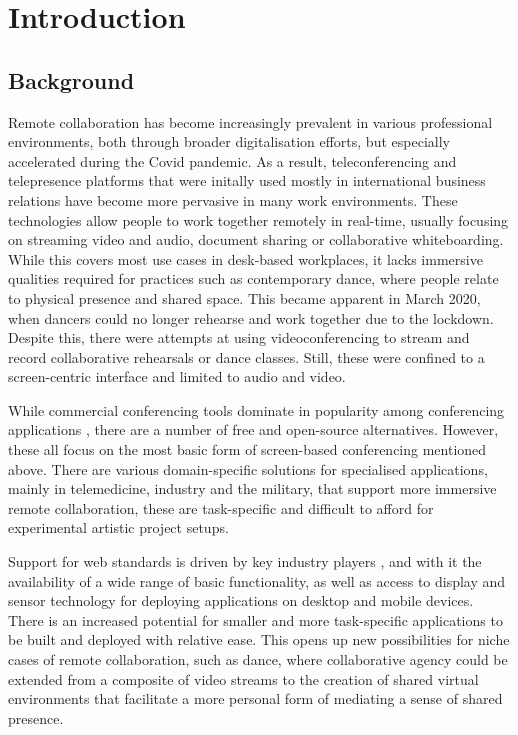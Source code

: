 \chapter{Introduction}
\label{chapter:introduction}

\section{Background}

Remote collaboration has become increasingly prevalent in various professional environments, both through broader digitalisation efforts, but especially accelerated during the Covid pandemic.
As a result, teleconferencing and telepresence platforms that were initally used mostly in international business relations have become more pervasive in many work environments.
These technologies allow people to work together remotely in real-time, usually focusing on streaming video and audio, document sharing or collaborative whiteboarding.
While this covers most use cases in desk-based workplaces, it lacks immersive qualities required for practices such as contemporary dance, where people relate to physical presence and shared space.
This became apparent in March 2020, when dancers could no longer rehearse and work together due to the lockdown.
Despite this, there were attempts at using videoconferencing to stream and record collaborative rehearsals or dance classes.
Still, these were confined to a screen-centric interface and limited to audio and video.

While commercial conferencing tools dominate in popularity among conferencing applications \parencite{mostPopularConferencingPlatforms}, there are a number of free and open-source alternatives.
However, these all focus on the most basic form of screen-based conferencing mentioned above.
There are various domain-specific solutions for specialised applications, mainly in telemedicine, industry and the military, that support more immersive remote collaboration, these are task-specific and difficult to afford for experimental artistic project setups.

Support for web standards is driven by key industry players \parencite{pushingInteroperabilityForward}, and with it the availability of a wide range of basic functionality, as well as access to display and sensor technology for deploying applications on desktop and mobile devices.
There is an increased potential for smaller and more task-specific applications to be built and deployed with relative ease.
This opens up new possibilities for niche cases of remote collaboration, such as dance, where collaborative agency could be extended from a composite of video streams to the creation of shared virtual environments that facilitate a more personal form of mediating a sense of shared presence.

